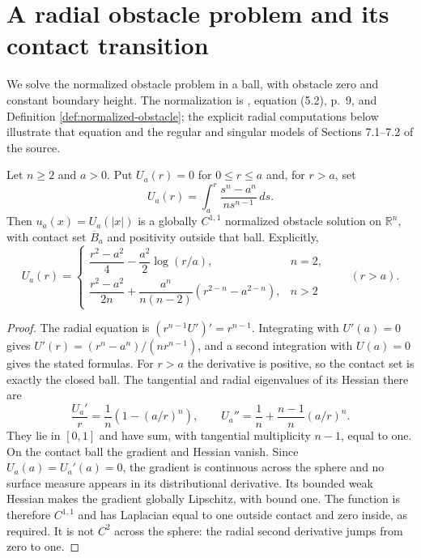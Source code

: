 \chapter{A radial obstacle problem and its contact transition}\label{sec:examples-radial-obstacle}
We solve the normalized obstacle problem in a ball, with obstacle zero and constant boundary height. The normalization is \cite{Fig18}, equation (5.2), p.~9, and Definition \ref{def:normalized-obstacle}; the explicit radial computations below illustrate that equation and the regular and singular models of Sections 7.1--7.2 of the source.

\begin{proposition}\label{prop:radial-obstacle-profile}
Let $n\geq2$ and $a>0$. Put $U_a(r)=0$ for $0\leq r\leq a$ and, for $r>a$, set
\[
 U_a(r)=\int_a^r\frac{s^n-a^n}{ns^{n-1}}\,ds.
\]
Then $u_a(x)=U_a(|x|)$ is a globally $C^{1,1}$ normalized obstacle solution on $\mathbb R^n$, with contact set $\overline B_a$ and positivity outside that ball. Explicitly,
\[
 U_a(r)=\begin{cases}
 \dfrac{r^2-a^2}{4}-\dfrac{a^2}{2}\log(r/a),&n=2,\\[4pt]
 \dfrac{r^2-a^2}{2n}+\dfrac{a^n}{n(n-2)}(r^{2-n}-a^{2-n}),&n>2
 \end{cases}\qquad(r>a).
\]
\end{proposition}
\begin{proof}
The radial equation is $(r^{n-1}U')'=r^{n-1}$. Integrating with $U'(a)=0$ gives $U'(r)=(r^n-a^n)/(nr^{n-1})$, and a second integration with $U(a)=0$ gives the stated formulas. For $r>a$ the derivative is positive, so the contact set is exactly the closed ball. The tangential and radial eigenvalues of its Hessian there are
\[
 \frac{U_a'}r=\frac1n\left(1-(a/r)^n\right),\qquad
 U_a''=\frac1n+\frac{n-1}{n}(a/r)^n.
\]
They lie in $[0,1]$ and have sum, with tangential multiplicity $n-1$, equal to one. On the contact ball the gradient and Hessian vanish. Since $U_a(a)=U_a'(a)=0$, the gradient is continuous across the sphere and no surface measure appears in its distributional derivative. Its bounded weak Hessian makes the gradient globally Lipschitz, with bound one. The function is therefore $C^{1,1}$ and has Laplacian equal to one outside contact and zero inside, as required. It is not $C^2$ across the sphere: the radial second derivative jumps from zero to one.
\end{proof}

